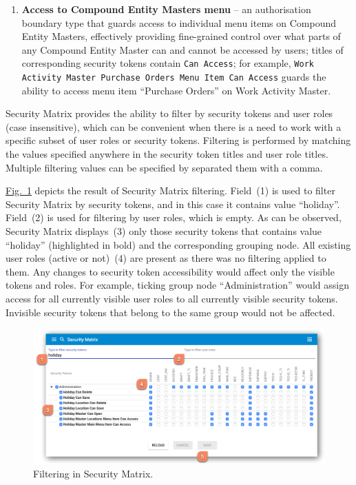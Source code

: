 \documentclass[a4paper,12pt,oneside,openright]{memoir}
\begin{document}
\begin{enumerate}
		\item\textbf{Access to Compound Entity Masters menu} -- an authorisation boundary type that guards access to individual menu items on Compound Entity Masters, effectively providing fine-grained control over what parts of any Compound Entity Master can and cannot be accessed by users; titles of corresponding security tokens contain \texttt{Can Access}; for example, \texttt{Work Activity Master Purchase Orders Menu Item Can Access} guards the ability to access menu item ``Purchase Orders'' on Work Activity Master.
	\end{enumerate}

	Security Matrix provides the ability to filter by security tokens and user roles (case insensitive), which can be convenient when there is a need to work with a specific subset of user roles or security tokens.
	Filtering is performed by matching the values specified anywhere in the security token titles and user role titles.
	Multiple filtering values can be specified by separated them with a comma.

	\hyperref[sec:03_01:fig:5]{Fig.~\ref*{sec:03_01:fig:5}} depicts the result of Security Matrix filtering.
	Field~(1) is used to filter Security Matrix by security tokens, and in this case it contains value ``holiday''.
	Field~(2) is used for filtering by user roles, which is empty.
	As can be observed, Security Matrix displays~(3) only those security tokens that contains value ``holiday'' (highlighted in bold) and the corresponding grouping node.
	All existing user roles (active or not)~(4) are present as there was no filtering applied to them.
	Any changes to security token accessibility would affect only the visible tokens and roles.
	For example, ticking group node ``Administration'' would assign access for all currently visible user roles to all currently visible security tokens.
	Invisible security tokens that belong to the same group would not be affected.

	\begin{figure}[h!tbp]
	\centering
	\includegraphics[width=0.9\linewidth]{images/10-security-matrix-filtering.png}
	\caption{Filtering in Security Matrix.}\label{sec:03_01:fig:5}
	\end{figure}
\end{document}
